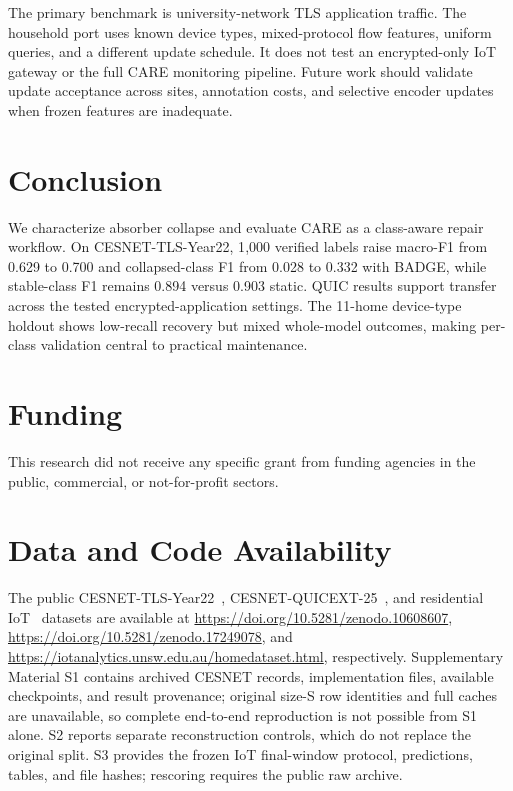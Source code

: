 \documentclass[journal]{IEEEtran}
\begin{document}
The primary benchmark is university-network TLS application traffic. The household port uses known device types, mixed-protocol flow features, uniform queries, and a different update schedule. It does not test an encrypted-only IoT gateway or the full CARE monitoring pipeline. Future work should validate update acceptance across sites, annotation costs, and selective encoder updates when frozen features are inadequate.



\section{Conclusion}
\label{sec:conclusion}

We characterize absorber collapse and evaluate CARE as a class-aware repair workflow. On CESNET-TLS-Year22, 1{,}000 verified labels raise macro-F1 from 0.629 to 0.700 and collapsed-class F1 from 0.028 to 0.332 with BADGE, while stable-class F1 remains 0.894 versus 0.903 static. QUIC results support transfer across the tested encrypted-application settings. The 11-home device-type holdout shows low-recall recovery but mixed whole-model outcomes, making per-class validation central to practical maintenance.

\section*{Funding}
This research did not receive any specific grant from funding agencies in the public, commercial, or not-for-profit sectors.

\section*{Data and Code Availability}

The public CESNET-TLS-Year22~\cite{hynek2024cesnet}, CESNET-QUICEXT-25~\cite{cesnetquicext25,mucke2025waiting}, and residential IoT~\cite{pashamokhtari2023dynamic} datasets are available at \url{https://doi.org/10.5281/zenodo.10608607}, \url{https://doi.org/10.5281/zenodo.17249078}, and \url{https://iotanalytics.unsw.edu.au/homedataset.html}, respectively. Supplementary Material S1 contains archived CESNET records, implementation files, available checkpoints, and result provenance; original size-S row identities and full caches are unavailable, so complete end-to-end reproduction is not possible from S1 alone. S2 reports separate reconstruction controls, which do not replace the original split. S3 provides the frozen IoT final-window protocol, predictions, tables, and file hashes; rescoring requires the public raw archive.
\end{document}
